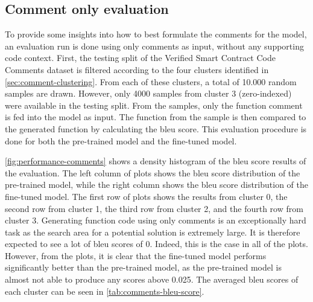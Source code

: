 \subsection{Comment only evaluation}
\label{sec:rq1-comment-only}
To provide some insights into how to best formulate the comments for the model, an evaluation run is done using only comments as input, without any supporting code context. First, the testing split of the Verified Smart Contract Code Comments dataset is filtered according to the four clusters identified in \cref{sec:comment-clustering}. From each of these clusters, a total of 10.000 random samples are drawn. However, only 4000 samples from cluster 3 (zero-indexed) were available in the testing split. From the samples, only the function comment is fed into the model as input. The function from the sample is then compared to the generated function by calculating the \gls{bleu} score. This evaluation procedure is done for both the pre-trained model and the fine-tuned model.

\cref{fig:performance-comments} shows a density histogram of the \acrshort{bleu} score results of the evaluation. The left column of plots shows the \acrshort{bleu} score distribution of the pre-trained model, while the right column shows the \acrshort{bleu} score distribution of the fine-tuned model. The first row of plots shows the results from cluster 0, the second row from cluster 1, the third row from cluster 2, and the fourth row from cluster 3. Generating function code using only comments is an exceptionally hard task as the search area for a potential solution is extremely large. It is therefore expected to see a lot of \acrshort{bleu} scores of 0. Indeed, this is the case in all of the plots. However, from the plots, it is clear that the fine-tuned model performs significantly better than the pre-trained model, as the pre-trained model is almost not able to produce any scores above 0.025. The averaged \acrshort{bleu} scores of each cluster can be seen in \cref{tab:comments-bleu-score}.

